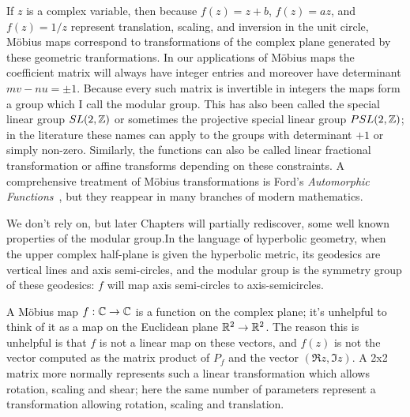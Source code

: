 If $z$ is a complex variable, then because $f(z)=z+b$, $f(z)=a z$, and $f(z)=1/z$  represent translation, scaling, and inversion in the unit circle,  M\"obius maps correspond to transformations of the complex plane generated by these geometric tranformations.  In  our applications of M\"obius maps the coefficient matrix will always have integer entries and moreover have determinant $mv-nu=\pm 1$. Because every such matrix is invertible in integers the maps form a group which I call the modular group. 
This has also been called the special linear group $SL(2,\mathbb{Z})$ or sometimes the projective special linear group $PSL(2,\mathbb{Z})$;  in the literature these names can apply to the groups with determinant $+1$ or simply non-zero.
	Similarly, the functions can also be called linear fractional transformation or affine transforms depending on these constraints. 
	 A comprehensive treatment of M\"obius transformations is Ford's \textit{Automorphic Functions}~\cite{fordAutomorphicFunctions1951}, but they reappear in many branches of modern mathematics.  

We don't rely on, but later Chapters will partially rediscover, some well known properties of the modular group.In the language of hyperbolic geometry, when the upper complex half-plane is given the hyperbolic metric, its geodesics are vertical lines and axis semi-circles, and the modular group is the symmetry group of these geodesics: $f$ will map axis semi-circles to axis-semicircles. 

A M\"obius map  $f:\mathbb{C}\rightarrow\mathbb{C}$ is a function on the complex plane; it's unhelpful to think of it as a map on the Euclidean plane $\mathbb{R}^2\rightarrow\mathbb{R}^2$.  The reason this is unhelpful is that $f$ is not a linear map on these vectors, and $f(z)$ is not the vector computed as the matrix product of $P_f$ and the vector $(\Re{z},\Im{z})$. A 2x2 matrix more normally represents such a linear transformation which allows rotation, scaling and shear; here the same number of parameters represent a transformation allowing rotation, scaling and translation. 


